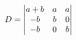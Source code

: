 \documentclass[preview]{standalone}
\begin{document}
\begin{align*}
\special{dvisvgm:raw <g id='unique000'>}D=\begin{vmatrix}a+b&a&a\\-b&b&0\\-b&0&b\end{vmatrix}\special{dvisvgm:raw </g>}
\end{align*}
\end{document}
